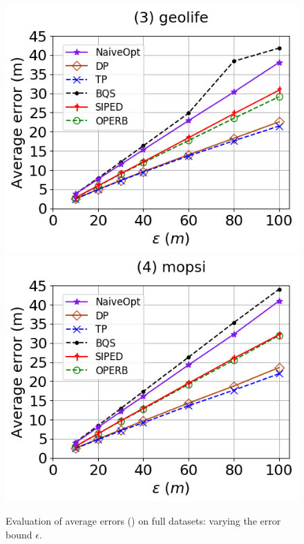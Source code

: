 \begin{figure}[tb!]
	\includegraphics[scale=0.315]{Figures/Exp-PED-error-epsilon-geolife.png}	\hspace{1ex}
	\includegraphics[scale=0.315]{Figures/Exp-PED-error-epsilon-mopsi.png}	
	\vspace{-3ex}
	\caption{\small Evaluation of average errors (\ped) on full datasets: varying the error bound $\epsilon$.}
	\label{fig:ae-ped-epsilon}
	\vspace{-2ex}
\end{figure}

